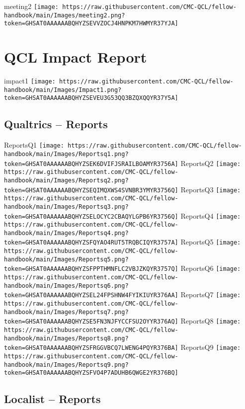 \documentclass[
]{book}
\begin{document}
meeting2
\texttt{[image: https://raw.githubusercontent.com/CMC-QCL/fellow-handbook/main/Images/meeting2.png?token=GHSAT0AAAAAABQHYZSEVVZOCJ4HNPKM7HWMYR37YJA]}

\hypertarget{qcl-impact-report}{%
\chapter{QCL Impact Report}\label{qcl-impact-report}}

impact1
\texttt{[image: https://raw.githubusercontent.com/CMC-QCL/fellow-handbook/main/Images/Impact1.png?token=GHSAT0AAAAAABQHYZSEVEU3G53QQ3BZQXQQYR37Y5A]}

\hypertarget{qualtrics-reports}{%
\section{Qualtrics -- Reports}\label{qualtrics-reports}}

ReportsQ1
\texttt{[image: https://raw.githubusercontent.com/CMC-QCL/fellow-handbook/main/Images/Reportsq1.png?token=GHSAT0AAAAAABQHYZSEK6DVIFJSRAILBOAMYR3756A]}
ReportsQ2
\texttt{[image: https://raw.githubusercontent.com/CMC-QCL/fellow-handbook/main/Images/Reportsq2.png?token=GHSAT0AAAAAABQHYZSEQIMQXWS4SVNBR3YMYR3756Q]}
ReportsQ3
\texttt{[image: https://raw.githubusercontent.com/CMC-QCL/fellow-handbook/main/Images/Reportsq3.png?token=GHSAT0AAAAAABQHYZSELOCYC2CBAQYLGPB6YR3756Q]}
ReportsQ4
\texttt{[image: https://raw.githubusercontent.com/CMC-QCL/fellow-handbook/main/Images/Reportsq4.png?token=GHSAT0AAAAAABQHYZSFQYAO4RUT5TRQBCIQYR3757A]}
ReportsQ5
\texttt{[image: https://raw.githubusercontent.com/CMC-QCL/fellow-handbook/main/Images/Reportsq5.png?token=GHSAT0AAAAAABQHYZSFPPTHMNFLC2VBJZKQYR3757Q]}
ReportsQ6
\texttt{[image: https://raw.githubusercontent.com/CMC-QCL/fellow-handbook/main/Images/Reportsq6.png?token=GHSAT0AAAAAABQHYZSEL24FPSHNW4FYIKIUYR376AA]}
ReportsQ7
\texttt{[image: https://raw.githubusercontent.com/CMC-QCL/fellow-handbook/main/Images/Reportsq7.png?token=GHSAT0AAAAAABQHYZSE5FN3NJFYCCFSU2OYYR376AQ]}
ReportsQ8
\texttt{[image: https://raw.githubusercontent.com/CMC-QCL/fellow-handbook/main/Images/Reportsq8.png?token=GHSAT0AAAAAABQHYZSFRGGVBCQ7LWENG4PQYR376BA]}
ReportsQ9
\texttt{[image: https://raw.githubusercontent.com/CMC-QCL/fellow-handbook/main/Images/Reportsq9.png?token=GHSAT0AAAAAABQHYZSFVO4P7ADUHB6QWGE2YR376BQ]}

\hypertarget{localist-reports}{%
\section{Localist -- Reports}\label{localist-reports}}
\end{document}
